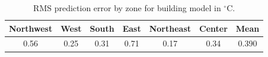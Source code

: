 \begin{table}[]
	\centering
	\caption{RMS prediction error by zone for building model in $^{\circ}$C.}
	\label{tab:data_RMS_zones}
	\begin{tabular}{*6c | c}
	\toprule
	Northwest & West & South & East & Northeast & Center & Mean \\ \hline
	0.56 & 0.25 & 0.31 & 0.71 & 0.17 & 0.34 & 0.390\\
	\bottomrule
	\end{tabular}
\end{table}

